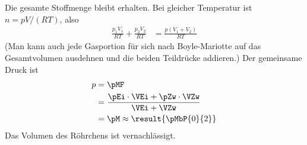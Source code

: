 Die gesamte Stoffmenge bleibt erhalten. Bei gleicher Temperatur ist $n = pV/(RT)$, also
\begin{align}
 \frac{p_1V_1}{RT}+\frac{p_2V_2}{RT} &= \frac{p\left(V_1+V_2\right)}{RT}
\end{align}
(Man kann auch jede Gasportion für sich nach Boyle-Mariotte auf das Gesamtvolumen ausdehnen und die beiden Teildrücke addieren.) Der gemeinsame Druck ist
\begin{align}
 p &= \pMF \\
   &= \frac{\pEi\cdot\VEi+\pZw\cdot\VZw}{\VEi+\VZw} \\
   &= \pM \approx \result{\pMbP{0}{2}}
\end{align}
Das Volumen des Röhrchens ist vernachlässigt.

